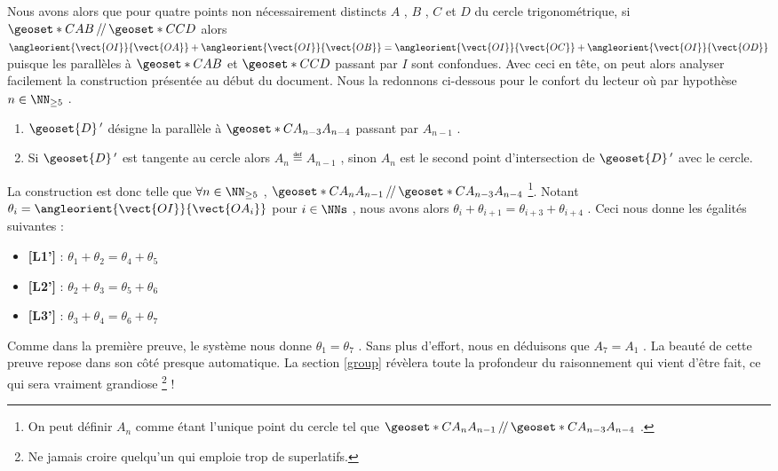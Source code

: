 \vspace{1em}


Nous avons alors que pour quatre points non nécessairement distincts $A$ , $B$ , $C$ et $D$ du cercle trigonométrique, si $\geoset*{C}{AB} \,/\!/\,\geoset*{C}{CD}$ alors
$\angleorient{\vect{OI}}{\vect{OA}} + \angleorient{\vect{OI}}{\vect{OB}} 
=
 \angleorient{\vect{OI}}{\vect{OC}} + \angleorient{\vect{OI}}{\vect{OD}}$ 
puisque les parallèles à $\geoset*{C}{AB}$ et $\geoset*{C}{CD}$ passant par $I$ sont confondues.
Avec ceci en tête, on peut alors analyser facilement la construction présentée au début du document.
Nous la redonnons ci-dessous pour le confort du lecteur où par hypothèse $n \in \NN_{\geq 5}$ .

\begin{enumerate}
	\item $\geoset{D}\,'$ désigne la parallèle à $\geoset*{C}{A_{n-3} A_{n-4}}$ passant par $A_{n-1}$ .

	\item Si $\geoset{D}\,'$ est tangente au cercle alors $A_n \eqdef A_{n-1}$ , sinon $A_n$ est le second point d'intersection de $\geoset{D}\,'$ avec le cercle.
\end{enumerate}


\medskip

La construction est donc telle que $\forall n \in \NN_{\geq 5}$ , 
$\geoset*{C}{A_{n} A_{n-1}} \,/\!/\, \geoset*{C}{A_{n-3} A_{n-4}}$ 
\footnote{
	On peut définir $A_{n}$ comme étant l'unique point du cercle tel que $\geoset*{C}{A_{n} A_{n-1}} \,/\!/\, \geoset*{C}{A_{n-3} A_{n-4}}$  .
}.
Notant $\theta_i = \angleorient{\vect{OI}}{\vect{OA_i}}$ pour $i \in \NNs$ , nous avons alors
$\theta_i + \theta_{i+1} = \theta_{i+3} + \theta_{i+4}$ . Ceci nous donne les égalités suivantes :
\begin{itemize}[label=\small\textbullet]
	\item \textbf{[L1']} : 
	      $\theta_1 + \theta_{2} = \theta_{4} + \theta_{5}$

	\item \textbf{[L2']} : 
	      $\theta_2 + \theta_{3} = \theta_{5} + \theta_{6}$

	\item \textbf{[L3']} : 
	      $\theta_3 + \theta_{4} = \theta_{6} + \theta_{7}$
\end{itemize}


\medskip

Comme dans la première preuve, le système nous donne $\theta_1 = \theta_7$ . Sans plus d'effort, nous en déduisons que $A_7 = A_1$ . La beauté de cette preuve repose dans son côté presque automatique. La section \ref{group} révèlera toute la profondeur du raisonnement qui vient d'être fait, ce qui sera vraiment grandiose
\footnote{
	Ne jamais croire quelqu'un qui emploie trop de superlatifs.
} !
